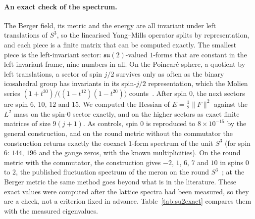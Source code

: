 \documentclass[11pt]{article}
\theoremstyle{definition}
\theoremstyle{remark}
\newcommand{\norm}[1]{\lVert #1\rVert}
\begin{document}
\paragraph{An exact check of the spectrum.} The Berger field, its metric and the energy are all
invariant under left translations of $S^3$, so the linearised Yang--Mills operator splits by
representation, and each piece is a finite matrix that can be computed exactly. The smallest
piece is the left-invariant sector: $\mathfrak{su}(2)$-valued $1$-forms that are constant in the
left-invariant frame, nine numbers in all. On the Poincar\'e sphere, a quotient by left
translations, a sector of spin $j/2$ survives only as often as the binary icosahedral group has
invariants in its spin-$j/2$ representation, which the Molien series
$(1+t^{30})/\bigl((1-t^{12})(1-t^{20})\bigr)$ counts~\cite{klein1884}. After spin $0$, the next
sectors are spin $6$, $10$, $12$ and $15$. We computed the Hessian of $E=\tfrac12\norm{F}^2$
against the $L^2$ mass on the spin-$0$ sector exactly, and on the higher sectors as exact finite
matrices of size $9(j+1)$. As controls, spin $0$ is reproduced to $8\times10^{-15}$ by the general
construction, and on the round metric without the commutator the construction returns exactly
the coexact $1$-form spectrum of the unit $S^3$ (for spin $6$: $144$, $196$ and the gauge zeros,
with the known multiplicities). On the round metric with the commutator, the construction gives
$-2$, $1$, $6$, $7$ and $10$ in spins $0$ to $2$, the published fluctuation spectrum of the meron
on the round $S^3$~\cite{klc2021}; at the Berger metric the same method goes beyond what is in the
literature. These exact values were computed after the lattice spectra had
been measured, so they are a check, not a criterion fixed in advance. Table~\ref{tab:su2exact} compares them with the
measured eigenvalues.
\end{document}
